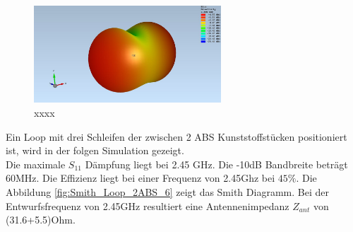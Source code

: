 \begin{figure}[h]
	\centering
	\includegraphics[width=7cm]{content/bilder/Evaluation/Loop/Mit1ABS/EM_Far_Filed_Loop_Coil_1ABS.JPG}%
	\caption{xxxx}
	\label{xxx}
\end{figure}

Ein Loop mit drei Schleifen der zwischen 2 ABS Kunststoffstücken positioniert ist, wird in der folgen Simulation gezeigt.\\
Die maximale $S_{11}$ Dämpfung liegt bei 2.45 GHz. Die -10dB Bandbreite beträgt 60MHz. Die Effizienz liegt bei einer Frequenz von 2.45Ghz bei $45\%$. Die Abbildung \ref{fig:Smith_Loop_2ABS_6} zeigt das Smith Diagramm. Bei der Entwurfsfrequenz von 2.45GHz resultiert eine Antennenimpedanz $Z_{ant}$ von (31.6+5.5)Ohm.

